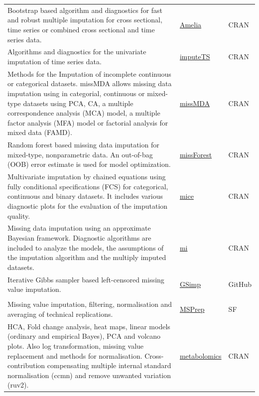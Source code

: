 \documentclass[]{article}
\begin{document}
\begin{longtable}[t]{>{\raggedright\arraybackslash}p{30em}>{\raggedright\arraybackslash}p{10em}>{\raggedright\arraybackslash}p{3em}}
Bootstrap based algorithm and diagnostics for fast and robust multiple imputation for cross sectional, time series or combined cross sectional and time series data. & \href{https://cran.r-project.org/web/packages/Amelia/Amelia.pdf}{Amelia} & CRAN\\
\rowcolor{gray!6}  Algorithms and diagnostics for the univariate imputation of time series data. & \href{https://cran.r-project.org/package=imputeTS}{imputeTS} & CRAN\\
Methods for the Imputation of incomplete continuous or categorical datasets. missMDA allows missing data imputation using in categorial, continuous or mixed-type datasets using PCA, CA, a multiple correspondence analysis (MCA) model, a multiple factor analysis (MFA) model or factorial analysis for mixed data (FAMD). & \href{https://cran.r-project.org/package=missMDA}{missMDA} & CRAN\\
\rowcolor{gray!6}  Random forest based missing data imputation for mixed-type, nonparametric data. An out-of-bag (OOB) error estimate is used for model optimization. & \href{https://cran.r-project.org/web/packages/missForest/missForest.pdf}{missForest} & CRAN\\
Multivariate imputation by chained equations using fully conditional specifications (FCS) for categorical, continuous and binary datasets. It includes various diagnostic plots for the evaluation of the imputation quality. & \href{https://cran.r-project.org/web/packages/mice/mice.pdf}{mice} & CRAN\\
\rowcolor{gray!6}  Missing data imputation using an approximate Bayesian framework. Diagnostic algorithms are included to analyze the models, the assumptions of the imputation algorithm and the multiply imputed datasets. & \href{https://cran.r-project.org/package=mi}{mi} & CRAN\\
Iterative Gibbs sampler based left-censored missing value imputation. & \href{https://github.com/WandeRum/GSimp}{GSimp} & GitHub\\
\rowcolor{gray!6}  \addlinespace[0.3em]
\multicolumn{3}{l}{\textbf{Multiple workflow steps}}\\
Missing value imputation, filtering, normalisation and averaging of technical replications. & \href{https://sourceforge.net/projects/msprep/}{MSPrep} & SF\\
HCA, Fold change analysis, heat maps, linear models (ordinary and empirical Bayes), PCA and volcano plots. Also log transformation, missing value replacement and methods for normalisation. Cross-contribution compensating multiple internal standard normalisation (ccmn) and remove unwanted variation (ruv2). & \href{https://cran.r-project.org/package=metabolomics}{metabolomics} & CRAN\\

\end{longtable}
\end{document}
